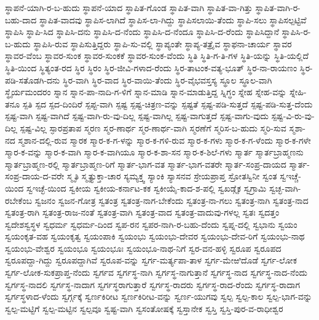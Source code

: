 ಸ್ಥಾಪನೆ-ಯಾಗಿ-ರ-ಬ-ಹುದು
ಸ್ಥಾಪನೆ-ಯಾದ
ಸ್ಥಾಪಿತ-ಗೊಂಡ
ಸ್ಥಾಪಿತ-ವಾಗಿ
ಸ್ಥಾಪಿತ-ವಾ-ಗಿತ್ತು
ಸ್ಥಾಪಿತ-ವಾಗಿ-ರ-ಬಹು-ದಾದ
ಸ್ಥಾಪಿತ-ವಾದವು
ಸ್ಥಾಪಿಸ-ಲಾಗಿದೆ
ಸ್ಥಾಪಿಸ-ಲಾ-ಗಿದ್ದು
ಸ್ಥಾಪಿಸಲಾಯಿ-ತೆಂದು
ಸ್ಥಾಪಿ-ಸಲು
ಸ್ಥಾಪಿಸಲ್ಪಟ್ಟಿವೆ
ಸ್ಥಾಪಿಸಿ
ಸ್ಥಾಪಿ-ಸಿದ
ಸ್ಥಾಪಿಸಿ-ದನು
ಸ್ಥಾಪಿಸಿ-ದ-ನೆಂದು
ಸ್ಥಾಪಿಸಿ-ದ-ನೆಂದೂ
ಸ್ಥಾಪಿಸಿ-ದ-ರೆಂದು
ಸ್ಥಾಪಿಸಿದ್ದಾನೆ
ಸ್ಥಾಪಿಸಿ-ರ-ಬ-ಹುದು
ಸ್ಥಾಪಿಸಿ-ರುವ
ಸ್ಥಾಪಿಸುತ್ತಿದ್ದರು
ಸ್ಥಾಪಿ-ಸು-ವಲ್ಲಿ
ಸ್ಥಾಪ್ಯಂತೇ
ಸ್ಥಾಪ್ಯ-ತತ್ರೈವ
ಸ್ಥಾಫನಾ-ಚಾರ್ಯ
ಸ್ಥಾವರ
ಸ್ಥಾವರ-ವೆಂಬ
ಸ್ಥಾವರ-ಸುಂಕ
ಸ್ಥಾವರ-ಸುಂಕಕೆ
ಸ್ಥಾವರ-ಸುಂಕ-ವೆಂದು
ಸ್ಥಿತಿ
ಸ್ಥಿತಿ-ಗ-ತಿ-ಗಳ
ಸ್ಥಿತಿ-ಯನ್ನು
ಸ್ಥಿತಿ-ಯಲ್ಲಿದೆ
ಸ್ಥಿತಿ-ಯಿಂದ
ಸ್ಥಿತ್ಯಂತ-ರದ
ಸ್ಥಿರ
ಸ್ಥಿರಂ
ಸ್ಥಿರ-ಜೀವಿ-ಗಳಾದ-ರೆಂದು
ಸ್ಥಿರ-ತಾಟಂಕ-ವತ್ಯ-ಭೂತ್
ಸ್ಥಿರ-ನಾ-ರಾಯಣಂ
ಸ್ಥಿರ-ಪಡಿ-ಸತೊಡಗಿ-ದನು
ಸ್ಥಿರ-ವಾಗಿ
ಸ್ಥಿರ-ವಾದ
ಸ್ಥಿರ-ವಾಯಿ-ತೆಂದು
ಸ್ಥಿರ-ವೈಭವಸ್ತಸ್ಯ
ಸ್ಥೂಲ
ಸ್ಥೂಲ-ವಾಗಿ
ಸ್ಥೈರ್ಯಮಂದರಂ
ಸ್ನಾನ
ಸ್ನಾನ-ಪಾ-ನಾದಿ-ಗ-ಳಿಗೆ
ಸ್ನಾನ-ಮಾಡಿ
ಸ್ನಾನ-ಮಾಡುತ್ತಿದ್ದ
ಸ್ನಿಗ್ಧಂ
ಸ್ನೇಹ
ಸ್ನೇಹ-ವನ್ನು
ಸ್ನೇಹಿ-ತನೂ
ಸ್ಪತಿ
ಸ್ಪದ
ಸ್ಪದ-ದಿಂದಿರೆ
ಸ್ಪಪ್ಟ-ವಾಗಿ
ಸ್ಪಷ್ಟ
ಸ್ಪಷ್ಟ-ಚಿತ್ರಣ-ವನ್ನು
ಸ್ಪಷ್ಟತೆ
ಸ್ಪಷ್ಟ-ಪಡಿ-ಸುತ್ತದೆ
ಸ್ಪಷ್ಟ-ಪಡಿ-ಸುತ್ತ-ದೆಂದು
ಸ್ಪಷ್ಟ-ವಾಗಿ
ಸ್ಪಷ್ಟ-ವಾಗಿದೆ
ಸ್ಪಷ್ಟ-ವಾಗಿ-ರು-ವು-ದಿಲ್ಲ
ಸ್ಪಷ್ಟ-ವಾಗಿಲ್ಲ
ಸ್ಪಷ್ಟ-ವಾಗುತ್ತದೆ
ಸ್ಪಷ್ಟ-ವಾಗು-ವುದು
ಸ್ಪಷ್ಟ-ವಿ-ರು-ವು-ದಿಲ್ಲ
ಸ್ಪಷ್ಟ-ವಿಲ್ಲ
ಸ್ಫಾರಪ್ರತಾಪ
ಸ್ಮರಣ
ಸ್ಮರ-ಣಾರ್ಥ
ಸ್ಮರ-ಣಾರ್ಥ-ವಾಗಿ
ಸ್ಮರಣೆಗೆ
ಸ್ಮರಿಸ-ಬ-ಹುದು
ಸ್ಮರಿ-ಸುವ
ಸ್ಮಶಾ-ನದ
ಸ್ಮಶಾನ-ದಲ್ಲಿ-ರುವ
ಸ್ಮಾರಕ
ಸ್ಮಾರ-ಕ-ಗ-ಳನ್ನು
ಸ್ಮಾರ-ಕ-ಗಳಿ-ರುವ
ಸ್ಮಾರ-ಕ-ಗಳು
ಸ್ಮಾರ-ಕ-ಗ-ಳೆಂದು
ಸ್ಮಾರ-ಕ-ಗಳೇ
ಸ್ಮಾರ-ಕ-ವನ್ನು
ಸ್ಮಾರ-ಕ-ವಾಗಿ
ಸ್ಮಾರ-ಕ-ವಾಗಿಯೂ
ಸ್ಮಾರ-ಕ-ಶಾ-ಸನ
ಸ್ಮಾರ-ಕ-ಶಿಲೆ-ಗಳು
ಸ್ಮಾರ್ತ
ಸ್ಮಾರ್ತಬ್ರಾಹ್ಮಣನು
ಸ್ಮಾರ್ತಬ್ರಾಹ್ಮಣ-ರಲ್ಲಿ
ಸ್ಮಾರ್ತಬ್ರಾಹ್ಮಣ-ರಿಗೆ
ಸ್ಮಾರ್ತ-ಭಾಗ-ವತ
ಸ್ಮಾರ್ತ-ಭಾಗ-ವತರೇ
ಸ್ಮಾರ್ತ-ಸಂಪ್ರ-ದಾಯದ
ಸ್ಮಾರ್ತ-ಸಂಪ್ರ-ದಾಯ-ದ-ವರೇ
ಸ್ಮೃತಿ
ಸ್ಮೃತ್ಯುಕ್ತಾ-ಚಾರ
ಸ್ಯಮ್ಯಕ್ತ್ವ
ಸ್ಯಾಂಕಿ
ಸ್ಯಾಸನವ
ಸ್ರೇಯಪ್ರಾಪ್ತ
ಸ್ರೋತಸ್ವಿನೀ
ಸ್ವಂತ
ಸ್ವಇಚ್ಚೆ-ಯಿಂದ
ಸ್ವಇಚ್ಛೆ-ಯಿಂದ
ಸ್ವಕೀಯ
ಸ್ವಕೀಯ-ಕರ್ನಾಟ-ಕಕ
ಸ್ವಕೀಯೈ-ಕಾದ-ಶ-ಪಲ್ಲಿ
ಸ್ವಖಡ್ಗೈಕ
ಸ್ವಗ್ರಾಮಿ
ಸ್ವಚ್ಛ-ವಾಗಿ-ರಬೇಕೆಂಬ
ಸ್ವಜನಂ
ಸ್ವಜನ-ಗೋತ್ರ
ಸ್ವತಂತ್ರ
ಸ್ವತಂತ್ರ-ನಾಗ-ಬೇಕೆಂದು
ಸ್ವತಂತ್ರ-ನಾ-ಗಲು
ಸ್ವತಂತ್ರ-ನಾಗಿ
ಸ್ವತಂತ್ರ-ನಾದ
ಸ್ವತಂತ್ರ-ರಾಗಿ
ಸ್ವತಂತ್ರ-ರಾಜ-ನಂತೆ
ಸ್ವತಂತ್ರ-ವಾಗಿ
ಸ್ವತಂತ್ರ-ವಾದ
ಸ್ವತಂತ್ರ-ವಾದುವು-ಗಳಲ್ಲ
ಸ್ವತಃ
ಸ್ವದತ್ತಂ
ಸ್ವದೇಶಸ್ವಸ್ಥಳ
ಸ್ವಧರ್ಮ
ಸ್ವಧರ್ಮ-ದಿಂದ
ಸ್ವಪ-ರನ
ಸ್ವಪರ-ನಾಗಿ-ರ-ಬಹು-ದೆಂದು
ಸ್ವಪ್ನ-ದಲ್ಲಿ
ಸ್ವಭಾನು
ಸ್ವಯಂ
ಸ್ವಯಂಕೃತ-ವಹ
ಸ್ವಯಂಕೃತ್ವ
ಸ್ವಯಂಪಾಕಿ
ಸ್ವಯಂಭು
ಸ್ವಯಂಭು-ದೇವರ
ಸ್ವಯಂಭು-ದೇವ-ರಿಗೆ
ಸ್ವಯಂಭು-ನಾಥ
ಸ್ವಯಂಭು-ವೇಶ್ವರ
ಸ್ವಯಂಭೂ
ಸ್ವಯಂಭೂಃ
ಸ್ವಯಂಭೂ-ನಾಥ-ನಿಗೆ
ಸ್ವರ-ವನ-ಹಳ್ಳಿ
ಸ್ವರೂಪ
ಸ್ವರೂಪದ
ಸ್ವರೂಪದ್ದಾ-ಗಿದ್ದು
ಸ್ವರೂಪದ್ದಾಗಿವೆ
ಸ್ವರೂಪ-ವನ್ನು
ಸ್ವರ್ಗ-ಮರ್ತ್ಯಪಾ-ತಾಳ
ಸ್ವರ್ಗ-ಮೇಱಿದೊಡೆ
ಸ್ವರ್ಗ-ಲೋಕ
ಸ್ವರ್ಗ-ಲೋಕ-ಸುಕಪ್ರಾಪ್ತ-ನೆಂದು
ಸ್ವರ್ಗವ
ಸ್ವರ್ಗಸ್ಥ-ನಾಗಿ
ಸ್ವರ್ಗಸ್ಥ-ನಾಗುತ್ತಾನೆ
ಸ್ವರ್ಗಸ್ಥ-ನಾದ
ಸ್ವರ್ಗಸ್ಥ-ನಾದ-ನೆಂದು
ಸ್ವರ್ಗಸ್ಥ-ನಾದಲಿ
ಸ್ವರ್ಗಸ್ಥ-ನಾದಾಗ
ಸ್ವರ್ಗಸ್ಥರಾಗುತ್ತಾರೆ
ಸ್ವರ್ಗಸ್ಥ-ರಾದರು
ಸ್ವರ್ಗಸ್ಥ-ರಾದ-ರೆಂದು
ಸ್ವರ್ಗಸ್ಥ-ರಾದಾಗ
ಸ್ವರ್ಗಸ್ಥಳಾದ-ಳೆಂದು
ಸ್ವರ್ಗ್ಗಕ್ಕೆ
ಸ್ವರ್ಣಕಿರೀಟ
ಸ್ವರ್ಣಕಿರೀಟ-ವನ್ನು
ಸ್ವರ್ಣ-ಯುಗವು
ಸ್ವಲ್ಪ
ಸ್ವಲ್ಪ-ಕಾಲ
ಸ್ವಲ್ಪ-ಭಾಗ-ವನ್ನು
ಸ್ವಲ್ಪ-ಮಟ್ಟಿಗೆ
ಸ್ವಲ್ಪ-ಮಟ್ಟಿನ
ಸ್ವಲ್ಪವೂ
ಸ್ವಷ್ಟ-ವಾಗಿ
ಸ್ವಸಂತೋಷಕ್ಕೆ
ಸ್ವಸ್ತಾನೇಕ
ಸ್ವಸ್ತಿ
ಸ್ವಸ್ತಿ-ಪುರ-ವ-ರಾಧೀಶ್ವರ
